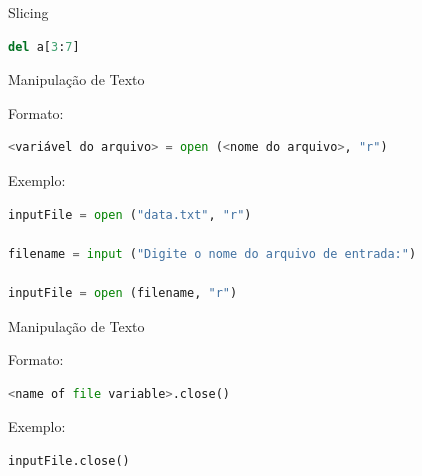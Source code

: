 \documentclass[aspectratio=169]{beamer} %
\begin{document}
\begin{SliTC}{Slicing}


\begin{itemize}
\end{itemize}

\begin{itemize}
\end{itemize}
\begin{lstlisting}[language=python]
 del a[3:7] 
\end{lstlisting}
\end{SliTC}
\begin{SliTC}{Manipulação de Texto}


\begin{itemize}
\end{itemize}

Formato:
\begin{lstlisting}[language=python]
 <variável do arquivo> = open (<nome do arquivo>, "r")
\end{lstlisting}
     

Exemplo:

\begin{lstlisting}[language=python]
inputFile = open ("data.txt", "r")
    
filename = input ("Digite o nome do arquivo de entrada:")
    
inputFile = open (filename, "r")
\end{lstlisting}
    
\end{SliTC}

\begin{SliTC}{Manipulação de Texto}

Formato:
\begin{lstlisting}[language=python]
<name of file variable>.close()
\end{lstlisting}
Exemplo:

\begin{lstlisting}[language=python]
inputFile.close()
\end{lstlisting}

\end{SliTC}
\end{document}
